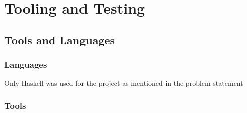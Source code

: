 \documentclass[12pt]{scrreprt}
\begin{document}
\chapter{Tooling and Testing}

\section {Tools and Languages}


\subsection{Languages}

Only Haskell was used for the project as mentioned in the problem statement

\subsection{Tools}
\end{document}
